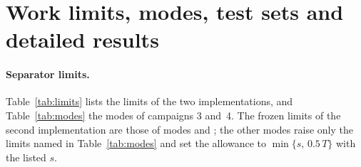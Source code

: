 \section{Work limits, modes, test sets and detailed results}\label{app:software}\label{app:instances}

\paragraph{Separator limits.}
Table~\ref{tab:limits} lists the limits of the two implementations, and
Table~\ref{tab:modes} the modes of campaigns 3 and~4. The frozen limits of the
second implementation are those of modes  and ; the other
modes raise only the limits named in Table~\ref{tab:modes} and set the
allowance to $\min\{s,\,0.5\,T\}$ with the listed $s$.

